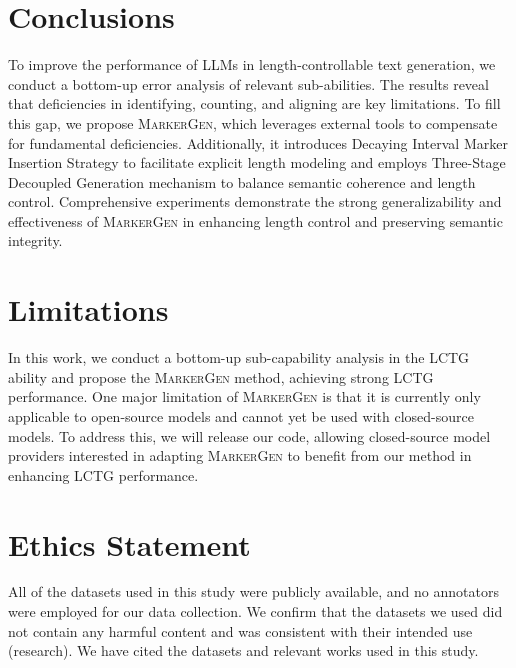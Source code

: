 \section*{Conclusions}
To improve the performance of LLMs in length-controllable text generation, we conduct a bottom-up error analysis of relevant sub-abilities. The results reveal that deficiencies in identifying, counting, and aligning are key limitations. To fill this gap, we propose \textsc{MarkerGen}, which leverages external tools to compensate for fundamental deficiencies. Additionally, it introduces Decaying Interval Marker Insertion Strategy to facilitate explicit length modeling and employs Three-Stage Decoupled Generation mechanism to balance semantic coherence and length control. Comprehensive experiments demonstrate the strong generalizability and effectiveness of \textsc{MarkerGen} in enhancing length control and preserving semantic integrity.
\section*{Limitations} 
In this work, we conduct a bottom-up sub-capability analysis in the LCTG ability and propose the \textsc{MarkerGen} method, achieving strong LCTG performance.
One major limitation of \textsc{MarkerGen} is that it is currently only applicable to open-source models and cannot yet be used with closed-source models. To address this, we will release our code, allowing closed-source model providers interested in adapting \textsc{MarkerGen} to benefit from our method in enhancing LCTG performance.


\section*{Ethics Statement}
All of the datasets used in this study were publicly available, and no annotators were employed for our data collection. We confirm that the datasets we used did not contain any harmful content and was consistent with their intended use (research). We have cited the datasets and relevant works used in this study.